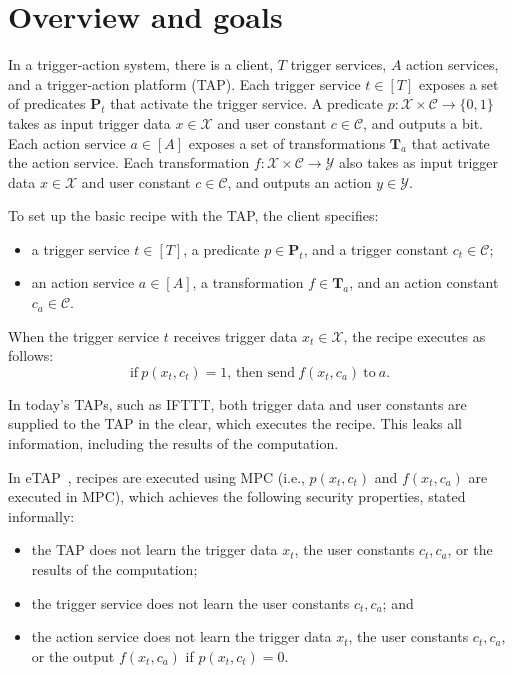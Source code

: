 \section{Overview and goals}
\label{sec:problem}

In a trigger-action system, there is a client, $T$ trigger services, $A$ action
services, and a trigger-action platform (TAP). Each trigger service $t \in [T]$
exposes a set of predicates $\mathbf{P}_t$ that activate the trigger service. A
predicate $p : \mathcal{X} \times \mathcal{C} \to \{0,1\}$ takes as input
trigger data $x \in \mathcal{X}$ and user constant $c \in \mathcal{C}$, and
outputs a bit. Each action service $a \in [A]$ exposes a set of transformations
$\mathbf{T}_a$ that activate the action service. Each transformation $f :
\mathcal{X} \times \mathcal{C} \to \mathcal{Y}$ also takes as input trigger data
$x \in \mathcal{X}$ and user constant $c \in \mathcal{C}$, and outputs an action
$y \in \mathcal{Y}$.

To set up the basic recipe with the TAP, the client specifies:
\begin{itemize}
  \item a trigger service $t \in [T]$, a predicate $p \in \mathbf{P}_t$, and a
    trigger constant $c_t \in \mathcal{C}$;
  \item an action service $a \in [A]$, a transformation $f \in \mathbf{T}_a$,
    and an action constant $c_a \in \mathcal{C}$.
\end{itemize}
When the trigger service $t$ receives trigger data $x_t \in \mathcal{X}$, the
recipe executes as follows:
\[
  \text{if}~p(x_t, c_t) = 1\text{, then send}~f(x_t, c_a)~\text{to}~a.
\]

In today's TAPs, such as IFTTT, both trigger data and user constants are
supplied to the TAP in the clear, which executes the recipe. This leaks all
information, including the results of the computation.

In \textsf{eTAP}~\cite{DBLP:conf/sp/ChenCWSCF21}, recipes are executed using MPC
(i.e., $p(x_t, c_t)$ and $f(x_t, c_a)$ are executed in MPC), which achieves the
following security properties, stated informally:
\begin{itemize}
  \item the TAP does not learn the trigger data $x_t$, the user constants $c_t,
    c_a$, or the results of the computation;
  \item the trigger service does not learn the user constants $c_t, c_a$; and
  \item the action service does not learn the trigger data $x_t$, the user
    constants $c_t, c_a$, or the output $f(x_t, c_a)$ if $p(x_t, c_t) = 0$.
\end{itemize}

